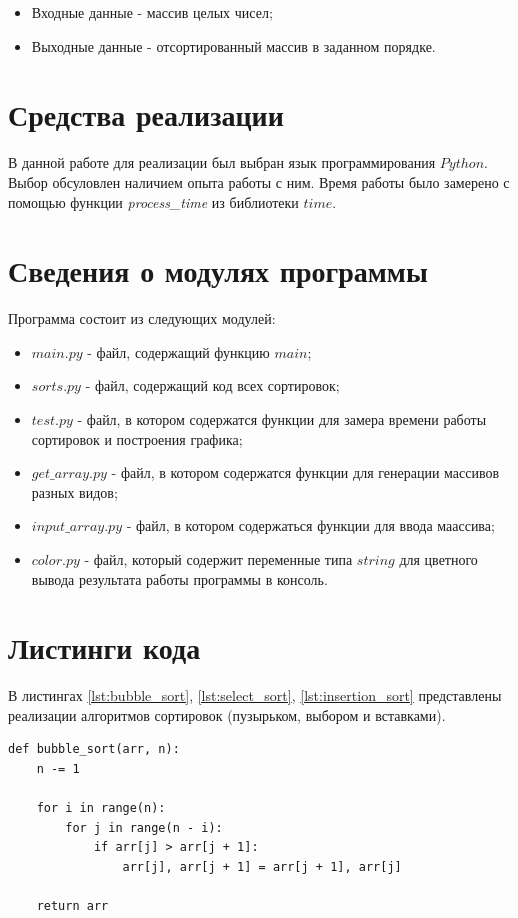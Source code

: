\documentclass[a4paper,14pt, unknownkeysallowed]{extreport}
\begin{document}
\begin{itemize}
    \item Входные данные - массив целых чисел;
    \item Выходные данные - отсортированный массив в заданном порядке.
\end{itemize}

\section{Средства реализации}
В данной работе для реализации был выбран язык программирования $Python$. Выбор обсуловлен наличием опыта работы с ним. Время работы было замерено с помощью функции \textit{process\_time} из библиотеки $time$.


\section{Сведения о модулях программы}
Программа состоит из следующих модулей:
\begin{itemize}
	\item $main.py$ - файл, содержащий функцию $main$;
    \item $sorts.py$ - файл, содержащий код всех сортировок;
    \item $test.py$ - файл, в котором содержатся функции для замера времени работы сортировок и построения графика;
    \item $get\_array.py$ - файл, в котором содержатся функции для генерации массивов разных видов;
    \item $input\_array.py$ - файл, в котором содержаться функции для ввода маассива;
    \item $color.py$ - файл, который содержит переменные типа $string$ для цветного вывода результата работы программы в консоль.
\end{itemize}


\section{Листинги кода}

В листингах \ref{lst:bubble_sort}, \ref{lst:select_sort}, \ref{lst:insertion_sort} представлены реализации алгоритмов сортировок (пузырьком, выбором и вставками).


\begin{center}
\captionsetup{justification=raggedright,singlelinecheck=off}
\begin{lstlisting}[label=lst:bubble_sort,caption=Алгоритм сортировки пузырьком]
def bubble_sort(arr, n):
    n -= 1

    for i in range(n):
        for j in range(n - i):
            if arr[j] > arr[j + 1]:
                arr[j], arr[j + 1] = arr[j + 1], arr[j]

    return arr
\end{lstlisting}
\end{center}
\end{document}
